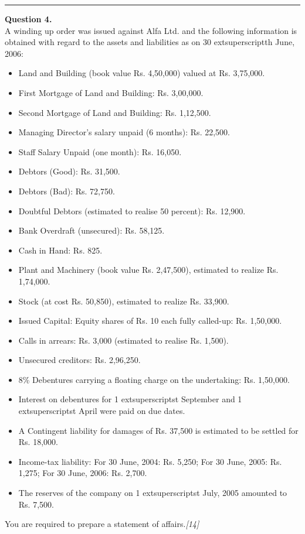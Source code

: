 \documentclass[11pt,a4paper]{article}
\newcommand{\pts}[1]{\hfill   \textit{[#1]}}
\begin{document}
\medskip\rule{\linewidth}{0.2pt}




\noindent   \textbf{Question 4.} \\
A winding up order was issued against Alfa Ltd. and the following information is obtained with regard to the assets and liabilities as on 30 extsuperscript{th} June, 2006:

\begin{itemize}[leftmargin=*]
  \item Land and Building (book value Rs. 4,50,000) valued at Rs. 3,75,000.
  \item First Mortgage of Land and Building: Rs. 3,00,000.
  \item Second Mortgage of Land and Building: Rs. 1,12,500.
  \item Managing Director's salary unpaid (6 months): Rs. 22,500.
  \item Staff Salary Unpaid (one month): Rs. 16,050.
  \item Debtors (Good): Rs. 31,500.
  \item Debtors (Bad): Rs. 72,750.
  \item Doubtful Debtors (estimated to realise 50 percent): Rs. 12,900.
  \item Bank Overdraft (unsecured): Rs. 58,125.
  \item Cash in Hand: Rs. 825.
  \item Plant and Machinery (book value Rs. 2,47,500), estimated to realize Rs. 1,74,000.
  \item Stock (at cost Rs. 50,850), estimated to realize Rs. 33,900.
  \item Issued Capital: Equity shares of Rs. 10 each fully called-up: Rs. 1,50,000.
  \item Calls in arrears: Rs. 3,000 (estimated to realise Rs. 1,500).
  \item Unsecured creditors: Rs. 2,96,250.
  \item 8\% Debentures carrying a floating charge on the undertaking: Rs. 1,50,000.
  \item Interest on debentures for 1 extsuperscript{st} September and 1 extsuperscript{st} April were paid on due dates.
  \item A Contingent liability for damages of Rs. 37,500 is estimated to be settled for Rs. 18,000.
  \item Income-tax liability: For 30 June, 2004: Rs. 5,250; For 30 June, 2005: Rs. 1,275; For 30 June, 2006: Rs. 2,700.
  \item The reserves of the company on 1 extsuperscript{st} July, 2005 amounted to Rs. 7,500.
\end{itemize}
You are required to prepare a statement of affairs.\pts{14}
\end{document}
